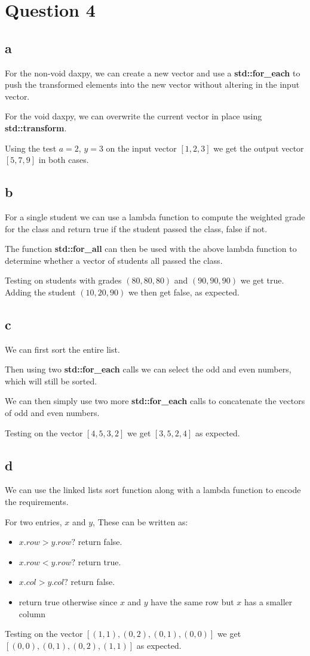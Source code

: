 \section{Question 4}

\subsection{a}
For the non-void daxpy, we can create a new vector and use a \textbf{std::for\_each} to push the transformed elements into the new vector without altering in the input vector.

For the void daxpy, we can overwrite the current vector in place using \textbf{std::transform}.

Using the test $a=2$, $y=3$ on the input vector $[1,2,3]$ we get the output vector $[5,7,9]$ in both cases.

\subsection{b}
For a single student we can use a lambda function to compute the weighted grade for the class and return true if the student passed the class, false if not.

The function \textbf{std::for\_all} can then be used with the above lambda function to determine whether a vector of students all passed the class.

Testing on students with grades $(80,80,80)$ and $(90,90,90)$ we get true. Adding the student $(10,20,90)$ we then get false, as expected. 

\subsection{c}
We can first sort the entire list.

Then using two \textbf{std::for\_each} calls we can select the odd and even numbers, which will still be sorted.

We can then simply use two more \textbf{std::for\_each} calls to concatenate the vectors of odd and even numbers.

Testing on the vector $[4,5,3,2]$ we get $[3,5,2,4]$ as expected.

\subsection{d}
We can use the linked lists sort function along with a lambda function to encode the requirements.

For two entries, $x$ and $y$, These can be written as:
\begin{itemize}
	\item $x.row > y.row?$ return false.
	\item $x.row < y.row?$ return true.
	\item $x.col > y.col?$ return false.
	\item return true otherwise since $x$ and $y$ have the same row but $x$ has a smaller column
\end{itemize}

Testing on the vector $[(1,1),(0,2),(0,1),(0,0)]$ we get $[(0,0),(0,1),(0,2),(1,1)]$ as expected.
